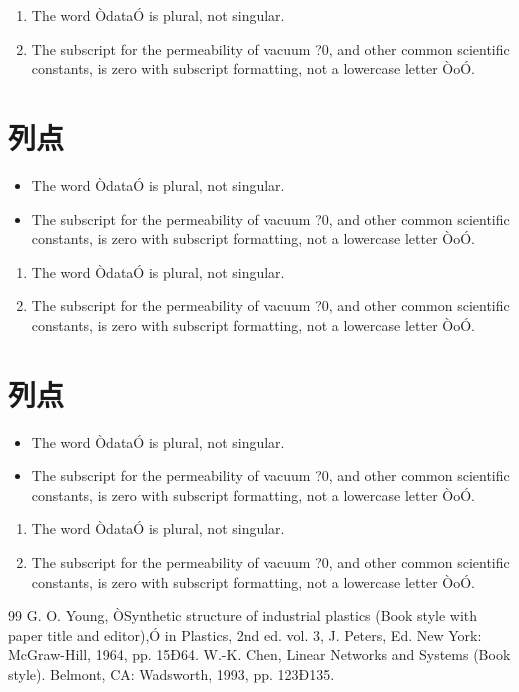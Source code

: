 \documentclass[letterpaper, 10 pt, conference]{ieeeconf}
\begin{document}
\begin{enumerate}
\item The word ÒdataÓ is plural, not singular.
\item The subscript for the permeability of vacuum ?0, and other common scientific constants, is zero with subscript formatting, not a lowercase letter ÒoÓ.
\end{enumerate}

\section{列点}

\begin{itemize}
\item The word ÒdataÓ is plural, not singular.
\item The subscript for the permeability of vacuum ?0, and other common scientific constants, is zero with subscript formatting, not a lowercase letter ÒoÓ.
\end{itemize}

\begin{enumerate}
\item The word ÒdataÓ is plural, not singular.
\item The subscript for the permeability of vacuum ?0, and other common scientific constants, is zero with subscript formatting, not a lowercase letter ÒoÓ.
\end{enumerate}


\section{列点}

\begin{itemize}
\item The word ÒdataÓ is plural, not singular.
\item The subscript for the permeability of vacuum ?0, and other common scientific constants, is zero with subscript formatting, not a lowercase letter ÒoÓ.
\end{itemize}

\begin{enumerate}
\item The word ÒdataÓ is plural, not singular.
\item The subscript for the permeability of vacuum ?0, and other common scientific constants, is zero with subscript formatting, not a lowercase letter ÒoÓ.
\end{enumerate}


\begin{thebibliography}{99}
 G. O. Young, ÒSynthetic structure of industrial plastics (Book style with paper title and editor),Ó 	in Plastics, 2nd ed. vol. 3, J. Peters, Ed.  New York: McGraw-Hill, 1964, pp. 15Ð64.
 W.-K. Chen, Linear Networks and Systems (Book style). Belmont, CA: Wadsworth, 1993, pp. 123Ð135.
\end{thebibliography}
\end{document}
